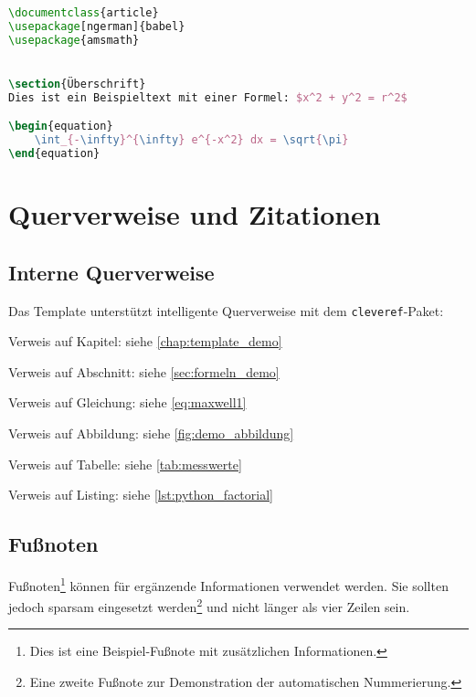 \begin{lstlisting}[caption={LaTeX-Beispiel: Dokumentstruktur},label={lst:latex_example},language=TeX]
\documentclass{article}
\usepackage[ngerman]{babel}
\usepackage{amsmath}


\section{Überschrift}
Dies ist ein Beispieltext mit einer Formel: $x^2 + y^2 = r^2$

\begin{equation}
    \int_{-\infty}^{\infty} e^{-x^2} dx = \sqrt{\pi}
\end{equation}

\end{lstlisting}

\section{Querverweise und Zitationen}
\label{sec:querverweise}

\subsection{Interne Querverweise}
\label{subsec:querverweise_intern}

Das Template unterstützt intelligente Querverweise mit dem \texttt{cleveref}-Paket:
\begin{listenabsatz}
	\item Verweis auf Kapitel: siehe \cref{chap:template_demo}
	\item Verweis auf Abschnitt: siehe \cref{sec:formeln_demo}
	\item Verweis auf Gleichung: siehe \cref{eq:maxwell1}
	\item Verweis auf Abbildung: siehe \cref{fig:demo_abbildung}
	\item Verweis auf Tabelle: siehe \cref{tab:messwerte}
	\item Verweis auf Listing: siehe \cref{lst:python_factorial}
\end{listenabsatz}

\subsection{Fußnoten}
\label{subsec:fussnoten_demo}

Fußnoten\footnote{Dies ist eine Beispiel-Fußnote mit zusätzlichen Informationen.} können für ergänzende Informationen verwendet werden. Sie sollten jedoch sparsam eingesetzt werden\footnote{Eine zweite Fußnote zur Demonstration der automatischen Nummerierung.} und nicht länger als vier Zeilen sein.


